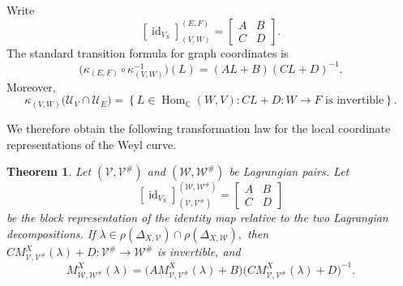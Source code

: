 \documentclass[10pt,a4paper]{amsart}
\newtheorem{thm}{Theorem}[section]
\numberwithin{equation}{section} \numberwithin{figure}{section}
\newcommand{\mb}[1]{\mathbb{#1}} %
\newcommand{\mc}[1]{\mathcal{#1}}
\newcommand{\id}{\operatorname{id}}
\begin{document}
Write
\[
    [\id_{V_S}]_{(V,W)}^{(E,F)}
    =
    \begin{bmatrix}
        A&B\\
        C&D
    \end{bmatrix}.
\]
The standard transition formula for graph coordinates is
\[
    \bigl(
        \kappa_{(E,F)}
        \circ
        \kappa_{(V,W)}^{-1}
    \bigr)(L)
    =
    (AL+B)(CL+D)^{-1}.
\]
Moreover,
\[
    \kappa_{(V,W)}
    \bigl(\mc U_V\cap\mc U_E\bigr)
    =
    \left\{
        L\in\operatorname{Hom}_{\mb C}(W,V):
        CL+D:W\longrightarrow F
        \text{ is invertible}
    \right\}.
\]



We therefore obtain the following transformation law for the local
coordinate representations of the Weyl curve.


\begin{thm}\label{thm:weyl-transformation-law}
Let \((\mc V,\mc V^\#)\) and \((\mc W,\mc W^\#)\) be Lagrangian
pairs. Let
\[
    [\id_{V_S}]_{(\mc V,\mc V^\#)}^{(\mc W,\mc W^\#)}
    =
    \begin{bmatrix}
        A&B\\
        C&D
    \end{bmatrix}
\]
be the block representation of the identity map relative to the two
Lagrangian decompositions. If
\(
    \lambda
    \in
    \rho(\Delta_{X,\mc V})
    \cap
    \rho(\Delta_{X,\mc W}),
\)
then
\(
    C M_{\mc V,\mc V^\#}^X(\lambda)+D:
    \mc V^\#
    \longrightarrow
    \mc W^\#
\)
is invertible, and
\[
    M_{\mc W,\mc W^\#}^X(\lambda)
    =
    \bigl(
        A M_{\mc V,\mc V^\#}^X(\lambda)+B
    \bigr)
    \bigl(
        C M_{\mc V,\mc V^\#}^X(\lambda)+D
    \bigr)^{-1}.
\]
\end{thm}
\end{document}
